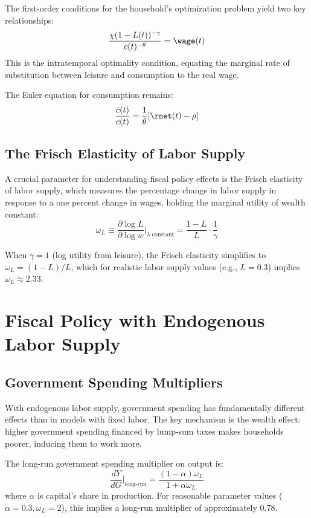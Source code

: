 \documentclass[\topdir/lecture\_notes.tex]{subfiles}
\begin{document}
The first-order conditions for the household's optimization problem yield two key relationships:
\begin{equation}
\frac{\chi(1-L(t))^{-\gamma}}{c(t)^{-\theta}} = \wage(t)
\end{equation}
This is the intratemporal optimality condition, equating the marginal rate of substitution between leisure and consumption to the real wage.

The Euler equation for consumption remains:
\begin{equation}
\frac{\dot{c}(t)}{c(t)} = \frac{1}{\theta}[\rnet(t) - \rho]
\end{equation}

\subsection{The Frisch Elasticity of Labor Supply}

A crucial parameter for understanding fiscal policy effects is the Frisch elasticity of labor supply, which measures the percentage change in labor supply in response to a one percent change in wages, holding the marginal utility of wealth constant:
\begin{equation}
\omega_L \equiv \frac{\partial \log L}{\partial \log w}\bigg|_{\lambda \text{ constant}} = \frac{1-L}{L} \cdot \frac{1}{\gamma}
\end{equation}

When $\gamma = 1$ (log utility from leisure), the Frisch elasticity simplifies to $\omega_L = (1-L)/L$, which for realistic labor supply values (e.g., $L = 0.3$) implies $\omega_L \approx 2.33$.

\section{Fiscal Policy with Endogenous Labor Supply}

\subsection{Government Spending Multipliers}

With endogenous labor supply, government spending has fundamentally different effects than in models with fixed labor. The key mechanism is the wealth effect: higher government spending financed by lump-sum taxes makes households poorer, inducing them to work more.

The long-run government spending multiplier on output is:
\begin{equation}
\frac{dY}{dG}\bigg|_{\text{long-run}} = \frac{(1-\alpha)\omega_L}{1 + \alpha\omega_L}
\end{equation}
where $\alpha$ is capital's share in production. For reasonable parameter values ($\alpha = 0.3, \omega_L = 2$), this implies a long-run multiplier of approximately 0.78.
\end{document}
